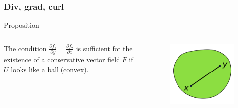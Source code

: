 \documentclass[xcolor=dvipsnames]{beamer}
\begin{document}
    \begin{frame}
    \frametitle{Div, grad, curl} 
    \begin{block}{Proposition} 
                \begin{columns}
        The condition $\frac{\partial f_1}{\partial y}=\frac{\partial f_2}{\partial x}$ is sufficient for the existence of a conservative vector field $F$ if $U$ looks like a ball (convex). 
            \begin{figure}[H]
            \centering
             \includegraphics[width=0.6\linewidth]{convex.png}
            \end{figure}
        \end{columns} 


\end{block}
\end{frame}
\end{document}
